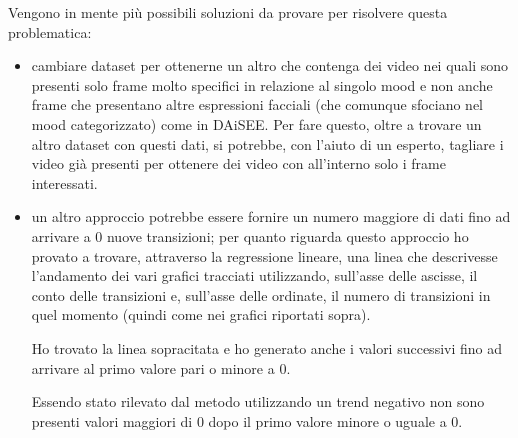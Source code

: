Vengono in mente più possibili soluzioni da provare per risolvere questa problematica:
\begin {itemize}
\item cambiare dataset per ottenerne un altro che contenga dei video nei quali sono presenti solo frame molto specifici in relazione al singolo mood e non anche frame che presentano altre espressioni facciali (che comunque sfociano nel mood categorizzato) come in DAiSEE.
Per fare questo, oltre a trovare un altro dataset con questi dati, si potrebbe, con l’aiuto di un esperto, tagliare i video già presenti per ottenere dei video con all’interno solo i frame interessati.
\item un altro approccio potrebbe essere fornire un numero maggiore di dati fino ad arrivare a 0 nuove transizioni; per quanto riguarda questo approccio ho provato a trovare, attraverso la regressione lineare, una linea che descrivesse l’andamento dei vari grafici tracciati utilizzando, sull’asse delle ascisse, il conto delle transizioni e, sull’asse delle ordinate, il numero di transizioni in quel momento (quindi come nei grafici riportati sopra).

Ho trovato la linea sopracitata e ho generato anche i valori successivi fino ad arrivare al primo valore pari o minore a 0. 

Essendo stato rilevato dal metodo utilizzando un trend negativo non sono presenti valori maggiori di 0 dopo il primo valore minore o uguale a 0.


\end{itemize}
